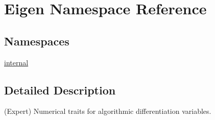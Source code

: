 \hypertarget{namespaceEigen}{}\section{Eigen Namespace Reference}
\label{namespaceEigen}
\subsection*{Namespaces}
\begin{DoxyCompactItemize}
\item 
 \hyperlink{namespaceEigen_1_1internal}{internal}
\end{DoxyCompactItemize}


\subsection{Detailed Description}
(Expert) Numerical traits for algorithmic differentiation variables. 